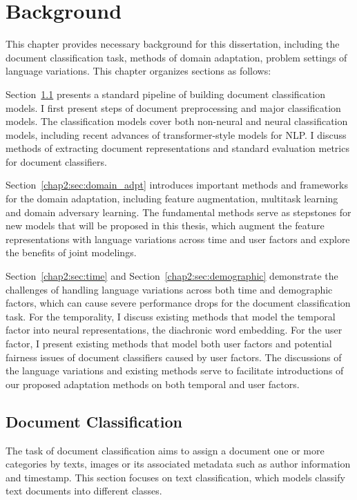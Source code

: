 \chapter{Background}
\label{chp:background}

This chapter provides necessary background for this dissertation, including the document classification task, methods of domain adaptation, problem settings of language variations.
This chapter organizes sections as follows:

Section~\ref{chap2:sec:doc_clf} presents a standard pipeline of building document classification models.
I first present steps of document preprocessing and major classification models. 
The classification models cover both non-neural and neural classification models, including recent advances of transformer-style models for NLP. 
I discuss methods of extracting document representations and standard evaluation metrics for document classifiers. 

Section~\ref{chap2:sec:domain_adpt} introduces important methods and frameworks for the domain adaptation, including feature augmentation, multitask learning and domain adversary learning. 
The fundamental methods serve as stepstones for new models that will be proposed in this thesis, which augment the feature representations with language variations across time and user factors and explore the benefits of joint modelings.

Section~\ref{chap2:sec:time} and Section~\ref{chap2:sec:demographic} demonstrate the challenges of handling language variations across both time and demographic factors, which can cause severe performance drops for the document classification task.
For the temporality, I discuss existing methods that model the temporal factor into neural representations, the diachronic word embedding. 
For the user factor, I present existing methods that model both user factors and potential fairness issues of document classifiers caused by user factors. 
The discussions of the language variations and existing methods serve to facilitate introductions of our proposed adaptation methods on both temporal and user factors.


\section{Document Classification}
\label{chap2:sec:doc_clf}

The task of document classification aims to assign a document one or more categories by texts, images or its associated metadata such as author information and timestamp.
This section focuses on text classification, which models classify text documents into different classes.


